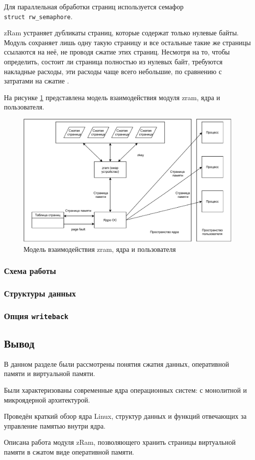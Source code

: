 Для параллельная обработки страниц используется семафор \\\texttt{struct rw\_semaphore}.

zRam устраняет дубликаты страниц, которые содержат только нулевые байты. Модуль сохраняет лишь одну такую страницу и все остальные такие же страницы ссылаются на неё, не проводя сжатие этих страниц. Несмотря на то, чтобы определить, состоит ли страница полностью из нулевых байт, требуются накладные расходы, эти расходы чаще всего небольшие, по сравнению с затратами на сжатие \cite{in-kernel-memory-compression}.

На рисунке \ref{fig:zram-kernel} представлена модель взаимодействия модуля zram, ядра и пользователя.

\begin{figure}[h]
	\centering
	\includegraphics[width=\textwidth]{img/zram-kernel.pdf}
	\caption{Модель взаимодействия zram, ядра и пользователя}
	\label{fig:zram-kernel}
\end{figure}

\subsubsection{Схема работы}

\subsubsection{Структуры данных}

\subsubsection{Опция \texttt{writeback}} 

\subsection{Вывод}

В данном разделе были рассмотрены понятия сжатия данных, оперативной памяти и виртуальной памяти. 

Были характеризованы современные ядра операционных систем: с монолитной и микроядерной архитектурой. 

Проведён краткий обзор ядра Linux, структур данных и функций отвечающих за управление памятью внутри ядра.

Описана работа модуля zRam, позволяющего хранить страницы виртуальной памяти в сжатом виде оперативной памяти.

\pagebreak
